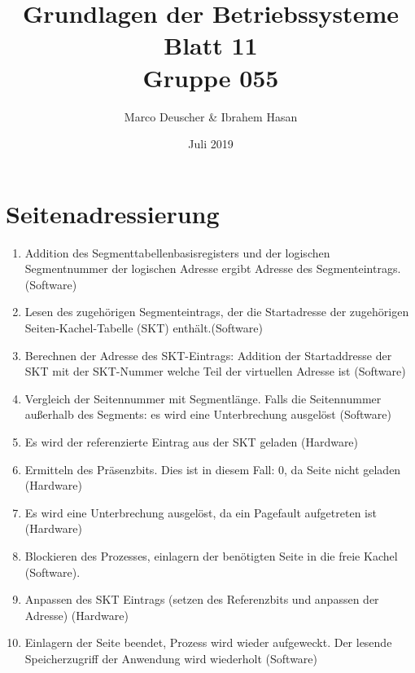 \documentclass[a4paper]{article}
\title{Grundlagen der Betriebssysteme\\ Blatt 11 \\ Gruppe 055}
\author{Marco Deuscher & Ibrahem Hasan}
\date{Juli 2019}
\begin{document}
\maketitle
\section{Seitenadressierung}

\begin{enumerate}
    \item Addition des Segmenttabellenbasisregisters und der logischen Segmentnummer der logischen Adresse ergibt Adresse des Segmenteintrags. (Software)
    \item Lesen des zugehörigen Segmenteintrags, der die Startadresse der zugehörigen Seiten-Kachel-Tabelle (SKT) enthält.(Software)
    \item Berechnen der Adresse des SKT-Eintrags: Addition der Startaddresse der SKT mit der SKT-Nummer welche Teil der virtuellen Adresse ist (Software)
    \item Vergleich der Seitennummer mit Segmentlänge. Falls die Seitennummer außerhalb des Segments: es wird eine Unterbrechung ausgelöst (Software)
    \item Es wird der referenzierte Eintrag aus der SKT geladen (Hardware)
    \item Ermitteln des Präsenzbits. Dies ist in diesem Fall: 0, da Seite nicht geladen (Hardware)
    \item Es wird eine Unterbrechung ausgelöst, da ein Pagefault aufgetreten ist (Hardware)
    \item Blockieren des Prozesses, einlagern der benötigten Seite in die freie Kachel (Software).
    \item Anpassen des SKT Eintrags (setzen des Referenzbits und anpassen der Adresse) (Hardware) 
    \item Einlagern der Seite beendet, Prozess wird wieder aufgeweckt. Der lesende Speicherzugriff der Anwendung wird wiederholt (Software)
\end{enumerate}

\newpage
\end{document}
